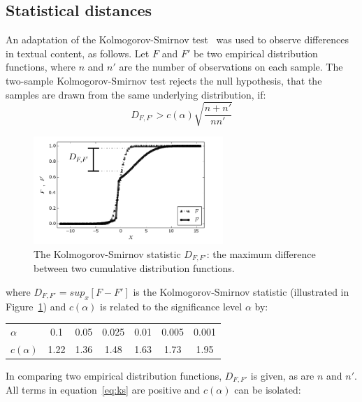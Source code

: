 \documentclass[review]{elsarticle}
\begin{document}
\subsection{Statistical distances}
An adaptation of the Kolmogorov-Smirnov test~\cite{kolm} was used to observe differences in textual content, as follows.
Let $F$ and $F'$ be two empirical distribution functions, where $n$ and $n'$ are the number of observations on each sample.
The two-sample Kolmogorov-Smirnov test rejects the null hypothesis, that the samples are drawn from the same underlying distribution, if:
\begin{equation}\label{eq:ks}
D_{F,F'} > c(\alpha)\sqrt{\frac{n+n'}{nn'}}
\end{equation}

\begin{figure}[!htbp] %
\vspace{-2pt}
\begin{center}
	\includegraphics[width=0.64\textwidth]{./figs/Dnn}
	\caption{The Kolmogorov-Smirnov statistic $D_{F,F'}$: the maximum difference between
		two cumulative distribution functions.}
	\label{fig:dnn}
\end{center}
\end{figure}


\noindent where $D_{F,F'}=sup_x[F - F']$ is the Kolmogorov-Smirnov statistic
(illustrated in Figure~\ref{fig:dnn})
and $c(\alpha)$ is related to the significance level $\alpha$ by:

\begin{table}[H]
\centering
\begin{tabular}{l|c c c c c c}
$\alpha$ & 0.1 & 0.05 & 0.025 & 0.01 & 0.005 & 0.001 \\
$c(\alpha)$ & 1.22 & 1.36 & 1.48 & 1.63 & 1.73 & 1.95 \\
\end{tabular}
\end{table}

In comparing two empirical distribution functions,
$D_{F,F'}$ is given, as are $n$ and $n'$.
All terms in equation~\ref{eq:ks} are positive and $c(\alpha)$ can be isolated:
\end{document}
